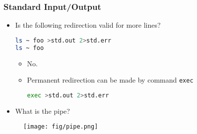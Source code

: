 \begin{frame}[fragile]
\frametitle{Standard Input/Output}
	\begin{itemize}

		\item Is the following redirection valid for more lines?
\begin{lstlisting}[language=bash]		
ls ~ foo >std.out 2>std.err
ls ~ foo
\end{lstlisting}		
		
		\begin{itemize}
			\item No.
			\item Permanent redirection can be made by command \texttt{exec}
\begin{lstlisting}[language=bash]		
exec >std.out 2>std.err
\end{lstlisting}				
		\end{itemize}

		\item What is the pipe?
	\end{itemize}
		
	\begin{figure}[h]
	 	\centering
        		\texttt{[image: fig/pipe.png]}
	\end{figure}

\end{frame}

